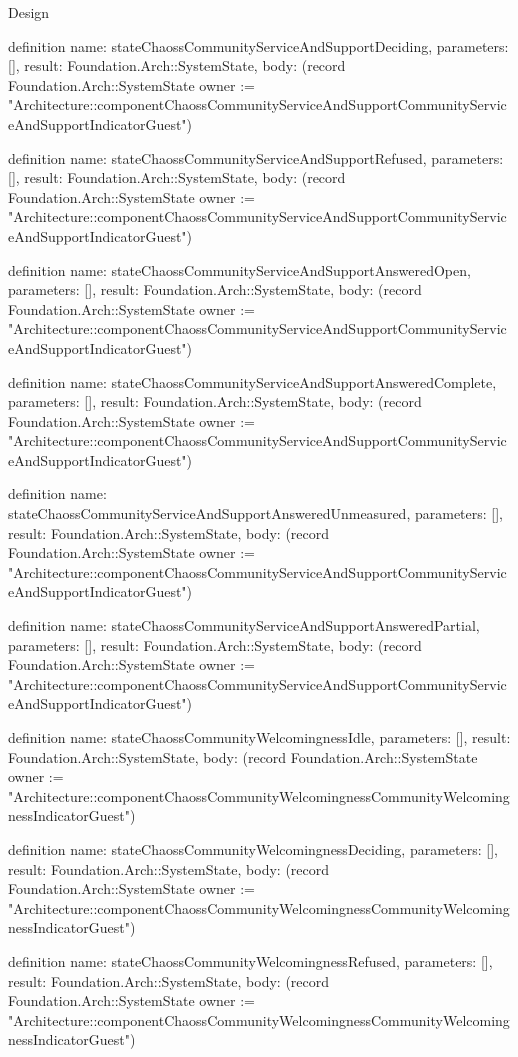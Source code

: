 \begin{lexlean}{Design}
\begin{semanticmodule}
definition{
  name: stateChaossCommunityServiceAndSupportDeciding,
  parameters: [],
  result: Foundation.Arch::SystemState,
  body: (record Foundation.Arch::SystemState {owner := "Architecture::componentChaossCommunityServiceAndSupportCommunityServiceAndSupportIndicatorGuest"})
}

definition{
  name: stateChaossCommunityServiceAndSupportRefused,
  parameters: [],
  result: Foundation.Arch::SystemState,
  body: (record Foundation.Arch::SystemState {owner := "Architecture::componentChaossCommunityServiceAndSupportCommunityServiceAndSupportIndicatorGuest"})
}

definition{
  name: stateChaossCommunityServiceAndSupportAnsweredOpen,
  parameters: [],
  result: Foundation.Arch::SystemState,
  body: (record Foundation.Arch::SystemState {owner := "Architecture::componentChaossCommunityServiceAndSupportCommunityServiceAndSupportIndicatorGuest"})
}

definition{
  name: stateChaossCommunityServiceAndSupportAnsweredComplete,
  parameters: [],
  result: Foundation.Arch::SystemState,
  body: (record Foundation.Arch::SystemState {owner := "Architecture::componentChaossCommunityServiceAndSupportCommunityServiceAndSupportIndicatorGuest"})
}

definition{
  name: stateChaossCommunityServiceAndSupportAnsweredUnmeasured,
  parameters: [],
  result: Foundation.Arch::SystemState,
  body: (record Foundation.Arch::SystemState {owner := "Architecture::componentChaossCommunityServiceAndSupportCommunityServiceAndSupportIndicatorGuest"})
}

definition{
  name: stateChaossCommunityServiceAndSupportAnsweredPartial,
  parameters: [],
  result: Foundation.Arch::SystemState,
  body: (record Foundation.Arch::SystemState {owner := "Architecture::componentChaossCommunityServiceAndSupportCommunityServiceAndSupportIndicatorGuest"})
}

definition{
  name: stateChaossCommunityWelcomingnessIdle,
  parameters: [],
  result: Foundation.Arch::SystemState,
  body: (record Foundation.Arch::SystemState {owner := "Architecture::componentChaossCommunityWelcomingnessCommunityWelcomingnessIndicatorGuest"})
}

definition{
  name: stateChaossCommunityWelcomingnessDeciding,
  parameters: [],
  result: Foundation.Arch::SystemState,
  body: (record Foundation.Arch::SystemState {owner := "Architecture::componentChaossCommunityWelcomingnessCommunityWelcomingnessIndicatorGuest"})
}

definition{
  name: stateChaossCommunityWelcomingnessRefused,
  parameters: [],
  result: Foundation.Arch::SystemState,
  body: (record Foundation.Arch::SystemState {owner := "Architecture::componentChaossCommunityWelcomingnessCommunityWelcomingnessIndicatorGuest"})
}


\end{semanticmodule}
\end{lexlean}
